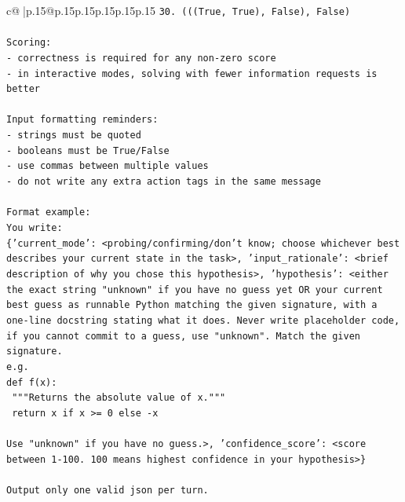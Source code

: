 \documentclass{article}
\begin{document}
{\begin{supertabular}{c@{$\;$}|p{.15\linewidth}@{}p{.15\linewidth}p{.15\linewidth}p{.15\linewidth}p{.15\linewidth}p{.15\linewidth}}
{{{\texttt{30. (((True, True), False), False)} \\
\\ 
\texttt{Scoring:} \\
\texttt{{-} correctness is required for any non{-}zero score} \\
\texttt{{-} in interactive modes, solving with fewer information requests is better} \\
\\ 
\texttt{Input formatting reminders:} \\
\texttt{{-} strings must be quoted} \\
\texttt{{-} booleans must be True/False} \\
\texttt{{-} use commas between multiple values} \\
\texttt{{-} do not write any extra action tags in the same message} \\
\\ 
\texttt{Format example:} \\
\texttt{You write:} \\
\texttt{\{'current\_mode': <probing/confirming/don't know; choose whichever best describes your current state in the task>, 'input\_rationale': <brief description of why you chose this hypothesis>, 'hypothesis': <either the exact string "unknown" if you have no guess yet OR your current best guess as runnable Python matching the given signature, with a one{-}line docstring stating what it does. Never write placeholder code, if you cannot commit to a guess, use "unknown". Match the given signature.} \\
\texttt{e.g.} \\
\texttt{def f(x):} \\
\texttt{	"""Returns the absolute value of x."""} \\
\texttt{	return x if x >= 0 else {-}x} \\
\\ 
\texttt{Use "unknown" if you have no guess.>, 'confidence\_score': <score between 1{-}100. 100 means highest confidence in your hypothesis>\}} \\
\\ 
\texttt{Output only one valid json per turn.} \\
            }
        }
    }
     \\ \\


\end{supertabular}}
\end{document}

